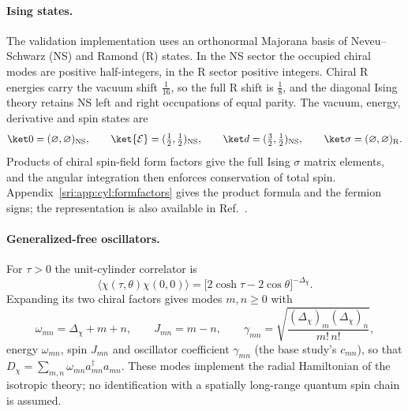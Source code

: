 \paragraph{Ising states.} The validation implementation uses an orthonormal Majorana basis of Neveu--Schwarz (NS) and
Ramond (R) states. In the NS sector the occupied chiral modes are positive half-integers, in the R sector positive
integers. Chiral R energies carry the vacuum shift $\frac1{16}$, so the full R shift is $\frac18$, and the diagonal
Ising theory retains NS left and right occupations of equal parity. The vacuum, energy, derivative and spin states are
\begin{equation}
 \ket0=(\varnothing,\varnothing)_{\rm NS},\qquad \ket{\mathcal E}=(\tfrac12,\tfrac12)_{\rm NS},\qquad
 \ket d=(\tfrac32,\tfrac12)_{\rm NS},\qquad \ket\sigma=(\varnothing,\varnothing)_{\rm R}.
\end{equation}
Products of chiral spin-field form factors give the full Ising $\sigma$ matrix elements, and the angular integration
then enforces conservation of total spin. Appendix~\ref{sri:app:cyl:formfactors} gives the product formula and the fermion
signs; the representation is also available in Ref.~\cite{sri:Liu:2026}.

\paragraph{Generalized-free oscillators.} For $\tau>0$ the unit-cylinder correlator is
\begin{equation}
 \langle\chi(\tau,\theta)\chi(0,0)\rangle=\bigl[2\cosh\tau-2\cos\theta\bigr]^{-\Delta_\chi}.
\end{equation}
Expanding its two chiral factors gives modes $m,n\ge0$ with
\begin{equation}
 \omega_{mn}=\Delta_\chi+m+n,\qquad J_{mn}=m-n,\qquad
 \gamma_{mn}=\sqrt{\frac{(\Delta_\chi)_m(\Delta_\chi)_n}{m!\,n!}},
\end{equation}
energy $\omega_{mn}$, spin $J_{mn}$ and oscillator coefficient $\gamma_{mn}$ (the base study's $c_{mn}$), so that
$D_\chi=\sum_{m,n}\omega_{mn}a^\dagger_{mn}a_{mn}$. These modes implement the radial Hamiltonian of the isotropic theory;
no identification with a spatially long-range quantum spin chain is assumed.

